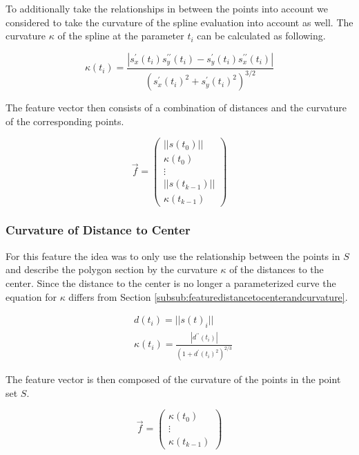 \documentclass[pdftex,12pt,a4paper]{report}
\begin{document}
To additionally take the relationships in between the points into account we considered
to take the curvature of the spline evaluation into account as well. The curvature $\kappa$ of the spline at the parameter $t_i$ can be calculated as following.

\begin{equation}
\kappa(t_i) = \frac{|s_x^\prime(t_i) s_y^{\prime\prime}(t_i) - s_y^\prime(t_i) s_x^{\prime\prime}(t_i)|}{(s_x^\prime(t_i)^2 + s_y^{\prime}(t_i)^2)^{3/2}}
\end{equation}

The feature vector then consists of a combination of distances and the curvature of the
corresponding points.

\begin{equation}
\vec{f} = \left( \begin{array}{c}
||s(t_0)|| \\
\kappa(t_0) \\
\vdots \\
||s(t_{k-1})|| \\
\kappa(t_{k-1})
\end{array} \right)
\end{equation}

\subsubsection{Curvature of Distance to Center}

For this feature the idea was to only use the relationship between the points in $S$ and describe
the polygon section by the curvature $\kappa$ of the distances to the center. Since the distance 
to the center is no longer a parameterized curve the equation for $\kappa$ differs from
Section \ref{subsub:featuredistancetocenterandcurvature}.

\begin{equation}
\begin{split}
& d(t_i) = ||s(t)_i|| \\
& \kappa(t_i) = \frac{|d^{\prime\prime}(t_i)|}{(1 + d^\prime(t_i)^2)^{2/3}}
\end{split}
\end{equation}

The feature vector is then composed of the curvature of the points in the point set $S$.

\begin{equation}
\vec{f} = \left( \begin{array}{c}
\kappa(t_0) \\
\vdots \\
\kappa(t_{k-1})
\end{array} \right)
\end{equation}
\end{document}
